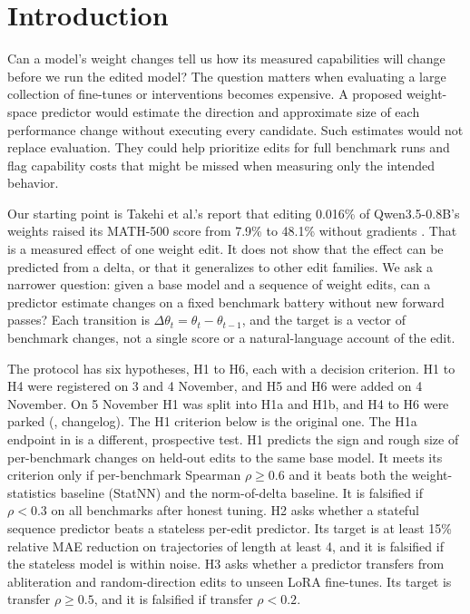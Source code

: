 \section{Introduction}

Can a model's weight changes tell us how its measured capabilities will change before we run the edited model? The question matters when evaluating a large collection of fine-tunes or interventions becomes expensive. A proposed weight-space predictor would estimate the direction and approximate size of each performance change without executing every candidate. Such estimates would not replace evaluation. They could help prioritize edits for full benchmark runs and flag capability costs that might be missed when measuring only the intended behavior.

Our starting point is Takehi et al.'s report that editing 0.016\% of Qwen3.5-0.8B's weights raised its MATH-500 score from 7.9\% to 48.1\% without gradients \citep{takehi2026wsp}. That is a measured effect of one weight edit. It does not show that the effect can be predicted from a delta, or that it generalizes to other edit families. We ask a narrower question: given a base model and a sequence of weight edits, can a predictor estimate changes on a fixed benchmark battery without new forward passes? Each transition is $\Delta\theta_t=\theta_t-\theta_{t-1}$, and the target is a vector of benchmark changes, not a single score or a natural-language account of the edit.

The protocol has six hypotheses, H1 to H6, each with a decision criterion. H1 to H4 were registered on 3 and 4 November, and H5 and H6 were added on 4 November. On 5 November H1 was split into H1a and H1b, and H4 to H6 were parked (, changelog). The H1 criterion below is the original one. The H1a endpoint in  is a different, prospective test. H1 predicts the sign and rough size of per-benchmark changes on held-out edits to the same base model. It meets its criterion only if per-benchmark Spearman $\rho \ge 0.6$ and it beats both the weight-statistics baseline (StatNN) and the norm-of-delta baseline. It is falsified if $\rho < 0.3$ on all benchmarks after honest tuning. H2 asks whether a stateful sequence predictor beats a stateless per-edit predictor. Its target is at least 15\% relative MAE reduction on trajectories of length at least 4, and it is falsified if the stateless model is within noise. H3 asks whether a predictor transfers from abliteration and random-direction edits to unseen LoRA fine-tunes. Its target is transfer $\rho \ge 0.5$, and it is falsified if transfer $\rho < 0.2$.

